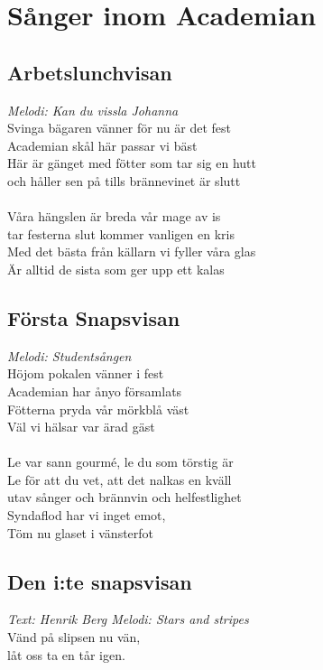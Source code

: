 \chapter{Sånger inom Academian}
\section{Arbetslunchvisan}
\textit{Melodi: Kan du vissla Johanna}
\vspace{2mm}\\
Svinga bägaren vänner för nu är det fest\\
Academian skål här passar vi bäst\\
Här är gänget med fötter som tar sig en hutt\\
och håller sen på tills brännevinet är slutt\\
\\
Våra hängslen är breda vår mage av is\\
tar festerna slut kommer vanligen en kris\\
Med det bästa från källarn vi fyller våra glas\\
Är alltid de sista som ger upp ett kalas\\

\section{Första Snapsvisan}
\textit{Melodi: Studentsången}
\vspace{2mm}\\
Höjom pokalen vänner i fest\\
Academian har ånyo församlats\\
Fötterna pryda vår mörkblå väst\\
Väl vi hälsar var ärad gäst\\
\\
Le var sann gourmé, le du som törstig är\\
Le för att du vet, att det nalkas en kväll\\
utav sånger och brännvin och helfestlighet\\
Syndaflod har vi inget emot,\\
Töm nu glaset i vänsterfot\\
\section{Den i:te snapsvisan}
\textit{Text: Henrik Berg \hspace{5mm} Melodi: Stars and stripes}
\vspace{2mm}\\
Vänd på slipsen nu vän,\\
låt oss ta en tår igen.\\
